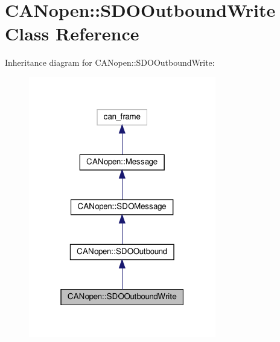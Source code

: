 \hypertarget{class_c_a_nopen_1_1_s_d_o_outbound_write}{}\section{C\+A\+Nopen\+:\+:S\+D\+O\+Outbound\+Write Class Reference}
\label{class_c_a_nopen_1_1_s_d_o_outbound_write}


Inheritance diagram for C\+A\+Nopen\+:\+:S\+D\+O\+Outbound\+Write\+:\nopagebreak
\begin{figure}[H]
\begin{center}
\leavevmode
\includegraphics[width=232pt]{class_c_a_nopen_1_1_s_d_o_outbound_write__inherit__graph}
\end{center}
\end{figure}


